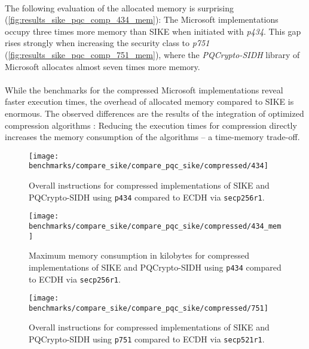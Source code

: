 \\
The following evaluation of the allocated memory is surprising (\autoref{fig:results_sike_pqc_comp_434_mem}): The Microsoft implementations occupy three times more memory than \gls{SIKE} when initiated with \textit{p434}. This gap rises strongly when increasing the security class to \textit{p751} (\autoref{fig:results_sike_pqc_comp_751_mem}), where the \textit{ \gls{PQCrypto-SIDH}} library of Microsoft allocates almost seven times more memory.
\\\\
While the benchmarks for the compressed Microsoft implementations reveal faster execution times, the overhead of allocated memory compared to \gls{SIKE} is enormous. The observed differences are the results of the integration of optimized compression algorithms \parencite{cryptoeprint:2020:431}: Reducing the execution times for compression directly increases the memory consumption of the algorithms -- a time-memory trade-off.


\begin{figure}[H]
  \centering
  \texttt{[image: benchmarks/compare\_sike/compare\_pqc\_sike/compressed/434]}
  \caption[Overall instructions for compressed implementations of \gls{SIKE} and \gls{PQCrypto-SIDH} using \texttt{p434}]
  {Overall instructions for compressed implementations of \gls{SIKE} and \gls{PQCrypto-SIDH} using \texttt{p434} compared to \gls{ECDH} via \texttt{secp256r1}.}
  \label{fig:results_sike_pqc_comp_434}
\end{figure}

\begin{figure}[H]
  \centering
  \texttt{[image: benchmarks/compare\_sike/compare\_pqc\_sike/compressed/434\_mem]}
  \caption[Maximum memory consumption in kilobytes for compressed implementations of \gls{SIKE} and \gls{PQCrypto-SIDH} using \texttt{p434}]
  {Maximum memory consumption in kilobytes for compressed implementations of \gls{SIKE} and \gls{PQCrypto-SIDH} using \texttt{p434} compared to \gls{ECDH} via \texttt{secp256r1}.}
  \label{fig:results_sike_pqc_comp_434_mem}
\end{figure}

\begin{figure}[H]
  \centering
  \texttt{[image: benchmarks/compare\_sike/compare\_pqc\_sike/compressed/751]}
  \caption[Overall instructions for compressed implementations of \gls{SIKE} and \gls{PQCrypto-SIDH} using \texttt{p751}]
  {Overall instructions for compressed implementations of \gls{SIKE} and \gls{PQCrypto-SIDH} using \texttt{p751} compared to \gls{ECDH} via \texttt{secp521r1}.}
  \label{fig:results_sike_pqc_comp_751}
\end{figure}

